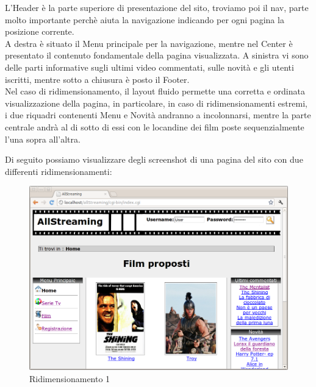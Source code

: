 \begin{itemize}
L'Header è la parte superiore di presentazione del sito, troviamo poi il nav, parte molto importante perchè aiuta la navigazione indicando per ogni pagina la posizione corrente.\\
A destra è situato il Menu principale per la navigazione, mentre nel Center è presentato il contenuto fondamentale della pagina visualizzata. A sinistra vi sono delle parti informative sugli ultimi video commentati, sulle novità e gli utenti iscritti, mentre sotto a chiusura è posto il Footer.\\
Nel caso di ridimensionamento, il layout fluido permette una corretta e ordinata visualizzazione della pagina, in particolare, in caso di ridimensionamenti estremi, i due riquadri contenenti Menu e Novità andranno a incolonnarsi, mentre la parte centrale andrà al di sotto di essi con le locandine dei film poste sequenzialmente l'una sopra all'altra.

\n Di seguito possiamo visualizzare degli screenshot di una pagina del sito con due differenti ridimensionamenti:

\begin{center}
\begin{figure}[H]
\centering
\includegraphics[scale=0.6]{images/screen3.png}
\caption{Ridimensionamento 1}
\end{figure}
\end{center}



\end{itemize}
